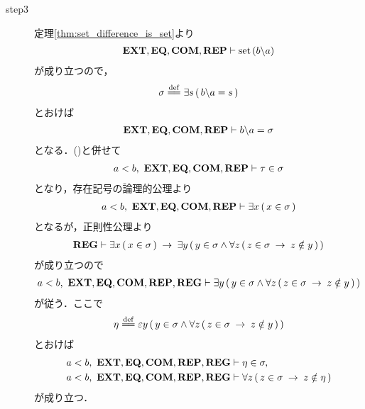 \begin{prf}
\begin{description}
			\item[step3] 定理\ref{thm:set_difference_is_set}より
				\begin{align}
					\mbox{{\bf EXT}},\mbox{{\bf EQ}},\mbox{\bf COM},\mbox{{\bf REP}} \vdash \operatorname*{set}\hspace{0.15em}(b \backslash a)
				\end{align}
				が成り立つので，
				\begin{align}
					\sigma \defeq \exists s\, (\, b \backslash a = s\, )
				\end{align}
				とおけば
				\begin{align}
					\mbox{{\bf EXT}},\mbox{{\bf EQ}},\mbox{\bf COM},\mbox{{\bf REP}} \vdash b \backslash a = \sigma
					\label{fom:element_and_proper_subset_correspond_8}
				\end{align}
				となる．()と併せて
				\begin{align}
					a < b,\ \mbox{{\bf EXT}},\mbox{{\bf EQ}},\mbox{\bf COM},\mbox{{\bf REP}} \vdash \tau \in \sigma
				\end{align}
				となり，存在記号の論理的公理より
				\begin{align}
					a < b,\ \mbox{{\bf EXT}},\mbox{{\bf EQ}},\mbox{\bf COM},\mbox{{\bf REP}} \vdash \exists x\, (\, x \in \sigma\, )
				\end{align}
				となるが，正則性公理より
				\begin{align}
					\mbox{{\bf REG}} \vdash \exists x\, (\, x \in \sigma\, ) 
					\hspace{0.25em}\rightarrow\hspace{0.25em} \exists y\, (\, y \in \sigma \wedge \forall z\, (\, z \in \sigma \hspace{0.25em}\rightarrow\hspace{0.25em} z \notin y\, )\, )
				\end{align}
				が成り立つので
				\begin{align}
					a < b,\ \mbox{{\bf EXT}},\mbox{{\bf EQ}},\mbox{\bf COM},\mbox{{\bf REP}},\mbox{{\bf REG}} \vdash 
					\exists y\, (\, y \in \sigma \wedge \forall z\, (\, z \in \sigma \hspace{0.25em}\rightarrow\hspace{0.25em} z \notin y\, )\, )
				\end{align}
				が従う．ここで
				\begin{align}
					\eta \defeq \varepsilon y\, (\, y \in \sigma \wedge 
					\forall z\, (\, z \in \sigma \rarrow z \notin y\, )\, )
				\end{align}
				とおけば
				\begin{align}
					a < b,\ \mbox{{\bf EXT}},\mbox{{\bf EQ}},\mbox{\bf COM},\mbox{{\bf REP}},\mbox{{\bf REG}} &\vdash \eta \in \sigma, 
					\label{fom:element_and_proper_subset_correspond_9} \\
					a < b,\ \mbox{{\bf EXT}},\mbox{{\bf EQ}},\mbox{\bf COM},\mbox{{\bf REP}},\mbox{{\bf REG}} &\vdash 
					\forall z\, (\, z \in \sigma \hspace{0.25em}\rightarrow\hspace{0.25em} z \notin \eta\, )
					\label{fom:element_and_proper_subset_correspond_10}
				\end{align}
				が成り立つ．
				

\end{description}
\end{prf}
